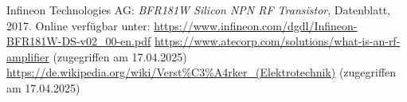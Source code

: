 \begin{thebibliography}{1}
Infineon Technologies AG: \emph{BFR181W Silicon NPN RF Transistor}, Datenblatt, 2017. Online verfügbar unter: \url{https://www.infineon.com/dgdl/Infineon-BFR181W-DS-v02_00-en.pdf}
\url{https://www.atecorp.com/solutions/what-is-an-rf-amplifier} (zugegriffen am 17.04.2025)
\url{https://de.wikipedia.org/wiki/Verst%C3%A4rker_(Elektrotechnik)} (zugegriffen am 17.04.2025)
\end{thebibliography}
%
\clearpage